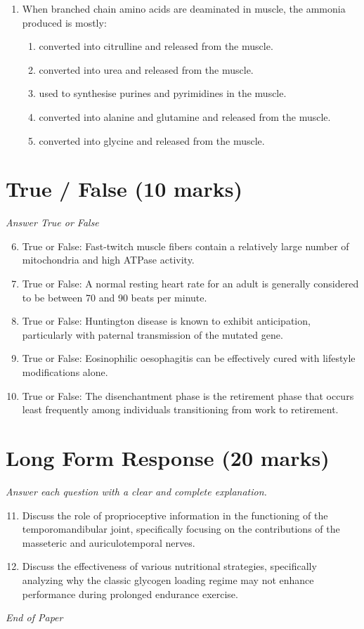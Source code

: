 \documentclass[12pt]{article}
\begin{document}
\begin{enumerate}[label=\arabic*.]
\begin{enumerate}[label=(\alph*)]
    \item Openness to experience
    \item Conscientiousness
\end{enumerate}
\item When branched chain amino acids are deaminated in muscle, the ammonia produced is mostly:
\begin{enumerate}[label=(\alph*)]
    \item converted into citrulline and released from the muscle.
    \item converted into urea and released from the muscle.
    \item used to synthesise purines and pyrimidines in the muscle.
    \item converted into alanine and glutamine and released from the muscle.
    \item converted into glycine and released from the muscle.
\end{enumerate}
\end{enumerate}

\section*{True / False (10 marks)}
\textit{Answer True or False}
\begin{enumerate}[label=\arabic*.]
\setcounter{enumi}{5}
\item True or False: Fast-twitch muscle fibers contain a relatively large number of mitochondria and high ATPase activity.
\item True or False: A normal resting heart rate for an adult is generally considered to be between 70 and 90 beats per minute.
\item True or False: Huntington disease is known to exhibit anticipation, particularly with paternal transmission of the mutated gene.
\item True or False: Eosinophilic oesophagitis can be effectively cured with lifestyle modifications alone.
\item True or False: The disenchantment phase is the retirement phase that occurs least frequently among individuals transitioning from work to retirement.
\end{enumerate}

\section*{Long Form Response (20 marks)}
\textit{Answer each question with a clear and complete explanation.}
\begin{enumerate}[label=\arabic*.]
\setcounter{enumi}{10}
\item Discuss the role of proprioceptive information in the functioning of the temporomandibular joint, specifically focusing on the contributions of the masseteric and auriculotemporal nerves.
\item Discuss the effectiveness of various nutritional strategies, specifically analyzing why the classic glycogen loading regime may not enhance performance during prolonged endurance exercise.
\end{enumerate}

\vfill
\noindent\textit{End of Paper}
\end{document}
